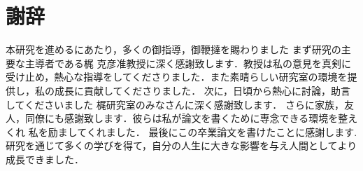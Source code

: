 \chapter*{謝辞}

本研究を進めるにあたり，多くの御指導，御鞭撻を賜わりました
まず研究の主要な主導者である梶 克彦准教授に深く感謝致します．教授は私の意見を真剣に受け止め，熱心な指導をしてくださりました．また素晴らしい研究室の環境を提供し，私の成長に貢献してくださりました．
次に，日頃から熱心に討論，助言してくださいました
梶研究室のみなさんに深く感謝致します．
さらに家族，友人，同僚にも感謝致します．彼らは私が論文を書くために専念できる環境を整えくれ
私を励ましてくれました．
最後にこの卒業論文を書けたことに感謝します.
研究を通じて多くの学びを得て，自分の人生に大きな影響を与え人間としてより成長できました．





